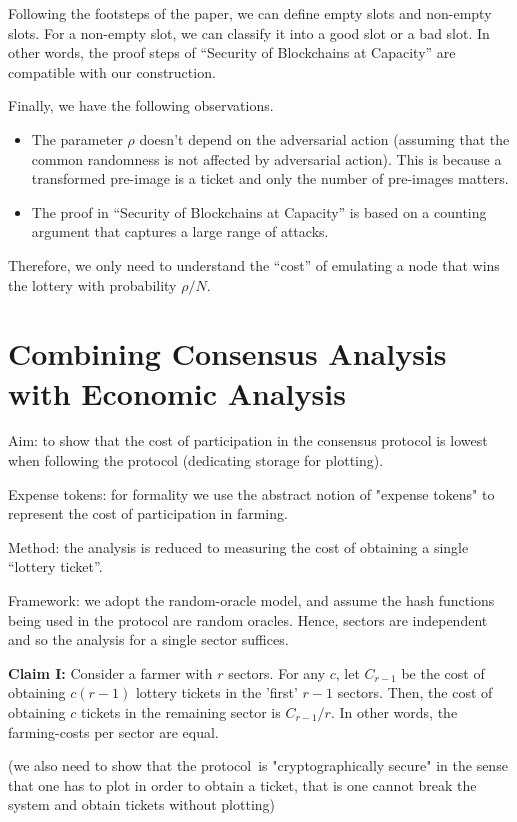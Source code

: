 \documentclass[12pt,draftcls,onecolumn]{IEEEtran}
\begin{document}
Following the footsteps of the paper, we can define empty slots and non-empty slots. For a non-empty slot, we can classify it into a good slot or a bad slot. In other words, the proof steps of ``Security of Blockchains at Capacity''  are compatible with our construction. 

Finally, we have the following observations.
\begin{itemize}
    \item The parameter $\rho$ doesn't depend on the adversarial action (assuming that the common randomness is not affected by adversarial action). This is because a transformed pre-image is a ticket and only the number of pre-images matters. 
    \item The proof in ``Security of Blockchains at Capacity'' is based on a counting argument that captures a large range of attacks.
\end{itemize}

Therefore, we only need to understand the ``cost'' of emulating a node that wins the lottery with probability $\rho / N$. 

\section{Combining Consensus Analysis with Economic Analysis}

Aim: to show that the cost of participation in the consensus protocol is lowest when following the protocol (dedicating storage for plotting).

Expense tokens: for formality we use the abstract notion of "expense tokens" to represent the cost of participation in farming.

Method: the analysis is reduced to measuring the cost of obtaining a single ``lottery ticket''.

Framework: we adopt the random-oracle model, and assume the hash functions being used in the protocol are random oracles. Hence, sectors are independent and so the analysis for a single sector suffices.

{\bf Claim I:} Consider a farmer with $r$ sectors. For any $c$, let $C_{r-1}$ be the cost of obtaining $c(r-1)$ lottery tickets in the 'first' $r-1$ sectors. Then, the cost of obtaining $c$ tickets in the remaining sector is $C_{r-1}/r$. In other words, the farming-costs per sector are equal.

(we also need to show that the protocol is "cryptographically secure" in the sense that one has to plot in order to obtain a ticket, that is one cannot break the system and obtain tickets without plotting)
\end{document}
